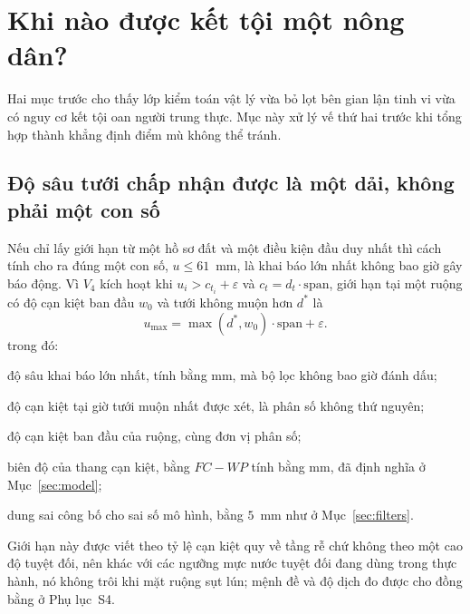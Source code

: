 \section{Khi nào được kết tội một nông dân?}
\label{sec:guarantee}

Hai mục trước cho thấy lớp kiểm toán vật lý vừa bỏ lọt bên gian lận tinh vi vừa có nguy
cơ kết tội oan người trung thực. Mục này xử lý vế thứ hai trước khi tổng hợp thành khẳng định điểm mù không thể tránh.

\subsection{Độ sâu tưới chấp nhận được là một dải, không phải một con số}
\label{sec:umax}

Nếu chỉ lấy giới hạn từ một hồ sơ đất và một điều kiện đầu duy nhất thì cách
tính cho ra đúng một con số, $u\le 61$~mm, là khai báo lớn nhất không bao giờ
gây báo động. Vì $V_4$ kích hoạt khi $u_i>c_{t_i}+\varepsilon$ và
$c_t=d_t\cdot\mathrm{span}$, giới hạn tại một ruộng có độ cạn kiệt ban đầu
$w_0$ và tưới không muộn hơn $d^{*}$ là
\begin{equation}
u_{\max}=\max(d^{*},w_0)\cdot\mathrm{span}+\varepsilon .
\label{eq:umax}
\end{equation}
trong đó:
\begin{symbolist}
\item[$u_{\max}$] độ sâu khai báo lớn nhất, tính bằng mm, mà bộ lọc không bao giờ đánh dấu;
\item[$d^{*}$] độ cạn kiệt tại giờ tưới muộn nhất được xét, là phân số không thứ nguyên;
\item[$w_0$] độ cạn kiệt ban đầu của ruộng, cùng đơn vị phân số;
\item[$\mathrm{span}$] biên độ của thang cạn kiệt, bằng $FC-WP$ tính bằng mm, đã định nghĩa ở Mục~\ref{sec:model};
\item[$\varepsilon$] dung sai công bố cho sai số mô hình, bằng $5$~mm như ở Mục~\ref{sec:filters}.
\end{symbolist}

Giới hạn này được viết theo tỷ lệ cạn kiệt quy về tầng rễ chứ không theo một
cao độ tuyệt đối, nên khác với các ngưỡng mực nước tuyệt đối đang dùng trong thực
hành, nó không trôi khi mặt ruộng sụt lún; mệnh đề và độ dịch đo được cho đồng bằng
ở Phụ lục~S4.

